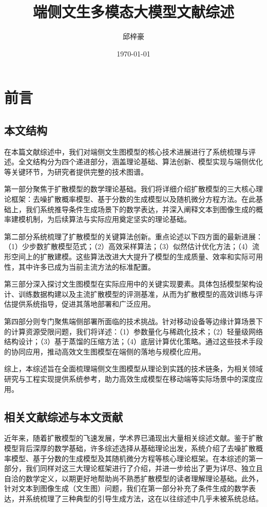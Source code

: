 \documentclass[11pt,a4paper,UTF8]{ctexart}
\title{端侧文生多模态大模型文献综述}
\author{邱梓豪}
\date{\today}
\begin{document}
\setcounter{tocdepth}{2}

\maketitle
\tableofcontents
\newpage

\section{前言}

\subsection{本文结构}

在本篇文献综述中，我们对端侧文生图模型的核心技术进展进行了系统梳理与评述。全文结构分为四个递进部分，涵盖理论基础、算法创新、模型实现与端侧优化等关键环节，为研究者提供完整的技术图谱。

第一部分聚焦于扩散模型的数学理论基础。我们将详细介绍扩散模型的三大核心理论框架：去噪扩散概率模型、基于分数的生成模型以及随机微分方程方法。在此基础上，我们系统推导条件生成场景下的数学表达，并深入阐释文本到图像生成的概率建模机制，为后续算法与实际应用奠定坚实的理论基础。

第二部分系统梳理了扩散模型的关键算法创新。重点论述以下四方面的最新进展：（1）少步数扩散模型范式；（2）高效采样算法；（3）似然估计优化方法；（4）流形空间上的扩散建模。这些算法改进大大提升了模型的生成质量、效率和实际可用性，其中许多已成为当前主流方法的标准配置。

第三部分深入探讨文生图模型在实际应用中的关键实现要素。具体包括模型架构设计、训练数据构建以及主流扩散模型的评测基准，从而为扩散模型的高效训练与评估提供系统指导，促进其落地部署和广泛应用。

第四部分则专门聚焦端侧部署所面临的技术挑战。针对移动设备等边缘计算场景下的计算资源受限问题，我们将详述：（1）参数量化与稀疏化技术；（2）轻量级网络结构设计；（3）基于蒸馏的压缩方法；（4）底层计算优化策略。通过这些技术手段的协同应用，推动高效文生图模型在端侧的落地与规模化应用。

综上，本综述旨在全面梳理端侧文生图模型从理论到实践的技术链条，为相关领域研究与工程实现提供系统参考，助力高效生成模型在移动端等实际场景中的深度应用。

\subsection{相关文献综述与本文贡献}

近年来，随着扩散模型的飞速发展，学术界已涌现出大量相关综述文献\cite{yang2023diffusion,croitoru2023diffusion,bie2024renaissance,song2024lightweight,jiang2024survey,fuest2024diffusion,cao2024survey,he2025diffusion}。鉴于扩散模型背后深厚的数学基础，许多综述\cite{yang2023diffusion,croitoru2023diffusion,bie2024renaissance,jiang2024survey,fuest2024diffusion,cao2024survey,he2025diffusion}选择从基础理论出发，系统介绍了去噪扩散概率模型、基于分数的生成模型及其随机微分方程等核心理论框架。在本综述的第一部分，我们同样对这三大理论框架进行了介绍，并进一步给出了更为详尽、独立且自洽的数学定义，以期更好地帮助尚不熟悉扩散模型的读者理解理论基础。此外，针对文本到图像生成（文生图）问题，我们在第一部分补充了条件生成的数学表达，并系统梳理了三种典型的引导生成方法，这在以往综述中几乎未被系统总结。
\end{document}

